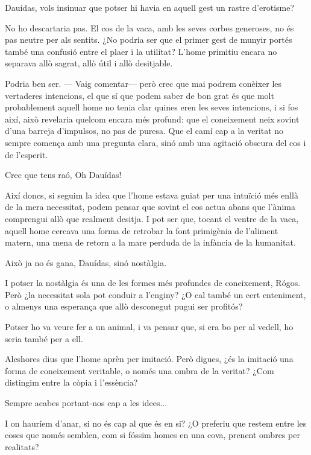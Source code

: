 \begin{platdialogue}
\item[\speaker{Karlótta:}] Dauídas, vols insinuar que potser hi havia en aquell gest un rastre d’erotisme?
\item[\speaker{Rógos:}] No ho descartaria pas. El cos de la vaca, amb les seves corbes generoses, no és pas neutre per als sentits. ¿No podria ser que el primer gest de munyir portés també una confusió entre el plaer i la utilitat? L’home primitiu encara no separava allò sagrat, allò útil i allò desitjable.
\item[\speaker{Dauídas:}] Podria ben ser. --- Vaig comentar--- però crec que mai podrem conèixer les vertaderes intencions, el que sí que podem saber de bon grat és que molt probablement aquell home no tenia clar quines eren les seves intencions, i si fos així, això revelaria quelcom encara més profund: que el coneixement neix sovint d’una barreja d’impulsos, no pas de puresa. Que el camí cap a la veritat no sempre comença amb una pregunta clara, sinó amb una agitació obscura del cos i de l’esperit.
\item[\speaker{Rógos:}] Crec que tens raó, Oh Dauídas!
\item[\speaker{Dauídas:}] Així doncs, si seguim la idea que l’home estava guiat per una intuïció més enllà de la mera necessitat, podem pensar que sovint el cos actua abans que l’ànima comprengui allò que realment desitja. I pot ser que, tocant el ventre de la vaca, aquell home cercava una forma de retrobar la font primigènia de l’aliment matern, una mena de retorn a la mare perduda de la infància de la humanitat.
\item[\speaker{Rógos:}] Això ja no és gana, Dauídas, sinó nostàlgia.
\item[\speaker{Dauídas:}] I potser la nostàlgia és una de les formes més profundes de coneixement, Rógos. Però ¿la necessitat sola pot conduir a l’enginy? ¿O cal també un cert enteniment, o almenys una esperança que allò desconegut pugui ser profitós?
\item[\speaker{Karlótta:}]Potser ho va veure fer a un animal, i va pensar que, si era bo per al vedell, ho seria també per a ell.
\item[\speaker{Dauídas:}] Aleshores dius que l’home aprèn per imitació. Però digues, ¿és la imitació una forma de coneixement veritable, o només una ombra de la veritat? ¿Com distingim entre la còpia i l’essència?
\item[\speaker{Rógos:}] Sempre acabes portant-nos cap a les idees...
\item[\speaker{Dauídas:}]I on hauríem d’anar, si no és cap al que és en si? ¿O preferiu que restem entre les coses que només semblen, com si fóssim homes en una cova, prenent ombres per realitats?
\end{platdialogue}
